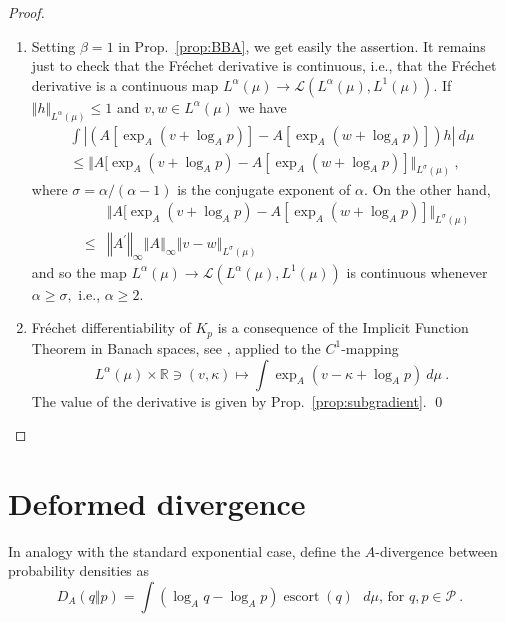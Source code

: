 \documentclass[graybox]{svmult}
\newcommand{\escortof}[1]{\operatorname{escort}\left(#1\right)}
\begin{document}
\begin{proof}
\begin{enumerate}
\item Setting $\beta =1$ in Prop.~\ref{prop:BBA}, we
get easily the assertion. It remains just to check that the Fr\'{e}chet
derivative is continuous, i.e., that the Fr\'echet derivative is a continuous
map $L^{\alpha }(\mu )\rightarrow \mathcal{L}(L^{\alpha }(\mu ),L^{1}(\mu ))$. If $\Vert {h}\Vert _{L^{\alpha }(\mu )}\leq 1$ and $v,w\in L^{\alpha }(\mu
)$ we have 
\begin{multline*}
\int \left\vert {(A[\exp _{A}(v+\log _{A}p)]-A[\exp _{A}(w+\log _{A}p)])h}
\right\vert \ d\mu \\
\leq \Vert {A[\exp _{A}(v+\log _{A}p)-A[\exp _{A}(w+\log _{A}p)]}\Vert
_{L^{\sigma }(\mu )}\ ,
\end{multline*}
where $\sigma =\alpha /\left( \alpha -1\right) $ is the conjugate exponent of $
\alpha $. On the other hand,
\begin{eqnarray*}
&&\Vert {A[\exp _{A}(v+\log _{A}p)-A[\exp _{A}(w+\log _{A}p)]}\Vert
_{L^{\sigma }(\mu )} \\
&\leq &\left\Vert A^{\prime }\right\Vert _{\infty }\left\Vert A\right\Vert
_{\infty }\left\Vert v-w\right\Vert _{L^{\sigma }(\mu )}
\end{eqnarray*}
and so the map $L^{\alpha }(\mu )\rightarrow \mathcal{L}(L^{\alpha }(\mu
),L^{1}(\mu ))$ is continuous whenever $\alpha \geq \sigma ,$ i.e., $\alpha
\geq 2$.

\item Fr\'echet differentiability of $K_{p}$ is a consequence of the
Implicit Function Theorem in Banach spaces, see \cite{dieudonne:60}, applied
to the $C^{1}$-mapping 
\begin{equation*}
L^{\alpha }(\mu )\times \mathbb{R}\ni (v,\kappa )\mapsto \int \exp
_{A}(v-\kappa +\log _{A}p)\ d\mu \ .
\end{equation*}
The value of the derivative is given by Prop.~\ref{prop:subgradient}. \qed
\end{enumerate}
\end{proof}

\section {Deformed divergence}
\label{sec:convex-conjugate}
%
In analogy with the standard exponential case, define the $A$-divergence between
probability densities as
\begin{equation*}
D_{A}(q\Vert p)=\int \left( \log _{A}q-\log _{A}p\right) \escortof{q}\text{ }
d\mu \text{, \ for }q,p\in \mathcal{P} \ .
\end{equation*}
\end{document}
